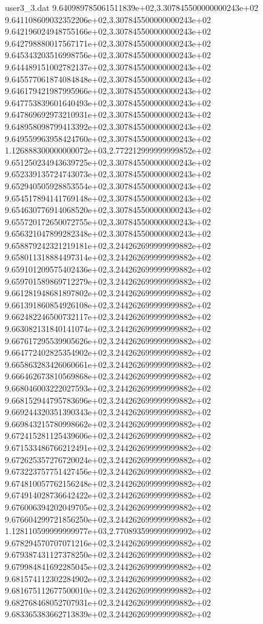 \begin{filecontents}{user3_3.dat}
9.640989785061511839e+02,3.307845500000000243e+02
9.641108609032352206e+02,3.307845500000000243e+02
9.642196024948755166e+02,3.307845500000000243e+02
9.642798880017567171e+02,3.307845500000000243e+02
9.645343203516998756e+02,3.307845500000000243e+02
9.644489151002782137e+02,3.307845500000000243e+02
9.645577061874084848e+02,3.307845500000000243e+02
9.646179421987995966e+02,3.307845500000000243e+02
9.647753839601640493e+02,3.307845500000000243e+02
9.647869692973210931e+02,3.307845500000000243e+02
9.648958098799413392e+02,3.307845500000000243e+02
9.649559963958424760e+02,3.307845500000000243e+02
1.126888300000000072e+03,2.772212999999999852e+02
9.651250234943639725e+02,3.307845500000000243e+02
9.652339135724743073e+02,3.307845500000000243e+02
9.652940505928853554e+02,3.307845500000000243e+02
9.654517894141769148e+02,3.307845500000000243e+02
9.654630776914068520e+02,3.307845500000000243e+02
9.655720172650072755e+02,3.307845500000000243e+02
9.656321047899282348e+02,3.307845500000000243e+02
9.658879242321219181e+02,3.244262699999999882e+02
9.658011318884497314e+02,3.244262699999999882e+02
9.659101209575402436e+02,3.244262699999999882e+02
9.659701589869712279e+02,3.244262699999999882e+02
9.661281948681897802e+02,3.244262699999999882e+02
9.661391860854926108e+02,3.244262699999999882e+02
9.662482246500732117e+02,3.244262699999999882e+02
9.663082131840141074e+02,3.244262699999999882e+02
9.667617295539905626e+02,3.244262699999999882e+02
9.664772402825354902e+02,3.244262699999999882e+02
9.665863283426060661e+02,3.244262699999999882e+02
9.666462673810569868e+02,3.244262699999999882e+02
9.668046003222027593e+02,3.244262699999999882e+02
9.668152944795783696e+02,3.244262699999999882e+02
9.669244320351390343e+02,3.244262699999999882e+02
9.669843215780998662e+02,3.244262699999999882e+02
9.672415281125439606e+02,3.244262699999999882e+02
9.671533486766212491e+02,3.244262699999999882e+02
9.672625357276720024e+02,3.244262699999999882e+02
9.673223757751427456e+02,3.244262699999999882e+02
9.674810057762156248e+02,3.244262699999999882e+02
9.674914028736642422e+02,3.244262699999999882e+02
9.676006394202049705e+02,3.244262699999999882e+02
9.676604299721856250e+02,3.244262699999999882e+02
1.128110599999999977e+03,2.770893599999999992e+02
9.678294570707071216e+02,3.244262699999999882e+02
9.679387431127378250e+02,3.244262699999999882e+02
9.679984841692285045e+02,3.244262699999999882e+02
9.681574112302284902e+02,3.244262699999999882e+02
9.681675112677500010e+02,3.244262699999999882e+02
9.682768468052707931e+02,3.244262699999999882e+02
9.683365383662713839e+02,3.244262699999999882e+02

\end{filecontents}
